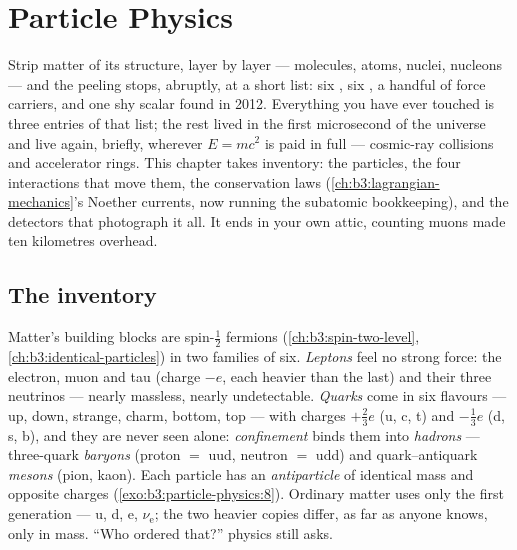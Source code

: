 \chapter{Particle Physics}\label{ch:b3:particle-physics}


Strip matter of its structure, layer by layer --- molecules, atoms,
nuclei, nucleons --- and the peeling stops, abruptly, at a short list:
six \emph{}, six \emph{}, a handful of force carriers,
and one shy scalar found in 2012. Everything you have ever touched is
three entries of that list; the rest lived in the first microsecond of
the universe and live again, briefly, wherever
$E = mc^2$ is paid in full --- cosmic-ray collisions and accelerator
rings. This chapter takes inventory: the particles, the four
interactions that move them, the conservation laws
(\cref{ch:b3:lagrangian-mechanics}'s Noether currents, now running the
subatomic bookkeeping), and the detectors that photograph it all. It
ends in your own attic, counting muons made ten kilometres overhead.

\section{The inventory}

\begin{definition}\label{def:b3:particle-physics:zoo}
Matter's building blocks are spin-$\tfrac12$ fermions
(\cref{ch:b3:spin-two-level}, \cref{ch:b3:identical-particles}) in
two families of six. \emph{Leptons} feel no strong force: the
electron, muon and tau (charge $-e$, each heavier than the last)
and their three neutrinos --- nearly massless, nearly
undetectable. \emph{Quarks} come in six flavours --- up, down,
strange, charm, bottom, top --- with charges $+\tfrac23e$ (u, c,
t) and $-\tfrac13e$ (d, s, b), and they are never seen alone:
\emph{confinement} binds them into \emph{hadrons} --- three-quark
\emph{baryons} (proton $=$ uud, neutron $=$ udd) and
quark--antiquark \emph{mesons} (pion, kaon). Each particle has an
\emph{antiparticle} of identical mass and opposite charges
(\cref{exo:b3:particle-physics:8}). Ordinary matter uses only the
first generation --- u, d, e, $\nu_{\text{e}}$; the two heavier
copies differ, as far as anyone knows, only in mass. ``Who
ordered that?'' physics still asks.
\end{definition}


